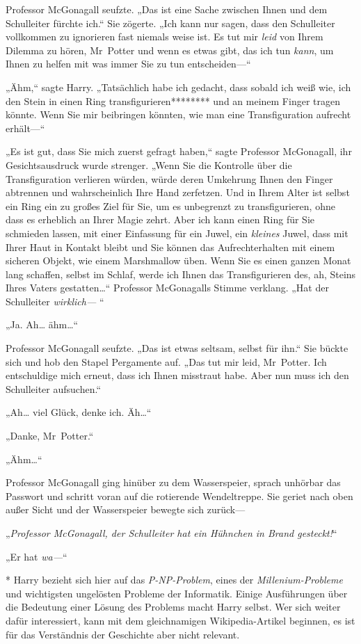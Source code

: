 {Professor McGonagall seufzte. „Das ist eine Sache zwischen Ihnen und dem Schulleiter fürchte ich.“ Sie zögerte. „Ich kann nur sagen, dass den Schulleiter vollkommen zu ignorieren fast niemals weise ist. Es tut mir \emph{leid} von Ihrem Dilemma zu hören, Mr~Potter und wenn es etwas gibt, das ich tun \emph{kann}, um Ihnen zu helfen mit was immer Sie zu tun entscheiden—“

„Ähm,“ sagte Harry. „Tatsächlich habe ich gedacht, dass sobald ich weiß wie, ich den Stein in einen Ring transfigurieren******** und an meinem Finger tragen könnte. Wenn Sie mir beibringen könnten, wie man eine Transfiguration aufrecht erhält—“

„Es ist gut, dass Sie mich zuerst gefragt haben,“ sagte Professor McGonagall, ihr Gesichtsausdruck wurde strenger. „Wenn Sie die Kontrolle über die Transfiguration verlieren würden, würde deren Umkehrung Ihnen den Finger abtrennen und wahrscheinlich Ihre Hand zerfetzen. Und in Ihrem Alter ist selbst ein Ring ein zu großes Ziel für Sie, um es unbegrenzt zu transfigurieren, ohne dass es erheblich an Ihrer Magie zehrt. Aber ich kann einen Ring für Sie schmieden lassen, mit einer Einfassung für ein Juwel, ein \emph{kleines} Juwel, dass mit Ihrer Haut in Kontakt bleibt und Sie können das Aufrechterhalten mit einem sicheren Objekt, wie einem Marshmallow üben. Wenn Sie es einen ganzen Monat lang schaffen, selbst im Schlaf, werde ich Ihnen das Transfigurieren des, ah, Steins Ihres Vaters gestatten…“ Professor McGonagalls Stimme verklang. „Hat der Schulleiter \emph{wirklich—} “

„Ja. Ah… ähm…“

Professor McGonagall seufzte. „Das ist etwas seltsam, selbst für ihn.“ Sie bückte sich und hob den Stapel Pergamente auf. „Das tut mir leid, Mr~Potter. Ich entschuldige mich erneut, dass ich Ihnen misstraut habe. Aber nun muss ich den Schulleiter aufsuchen.“

„Ah… viel Glück, denke ich. Äh…“

„Danke, Mr~Potter.“

„Ähm…“

Professor McGonagall ging hinüber zu dem Wasserspeier, sprach unhörbar das Passwort und schritt voran auf die rotierende Wendeltreppe. Sie geriet nach oben außer Sicht und der Wasserspeier bewegte sich zurück—

„\emph{Professor McGonagall, der Schulleiter hat ein Hühnchen in Brand gesteckt!}“

„Er hat \emph{wa—}“

* Harry bezieht sich hier auf das \emph{P-NP-Problem}, eines der \emph{Millenium-Probleme} und wichtigsten ungelösten Probleme der Informatik. Einige Ausführungen über die Bedeutung einer Lösung des Problems macht Harry selbst. Wer sich weiter dafür interessiert, kann mit dem gleichnamigen Wikipedia-Artikel beginnen, es ist für das Verständnis der Geschichte aber nicht relevant.

}
